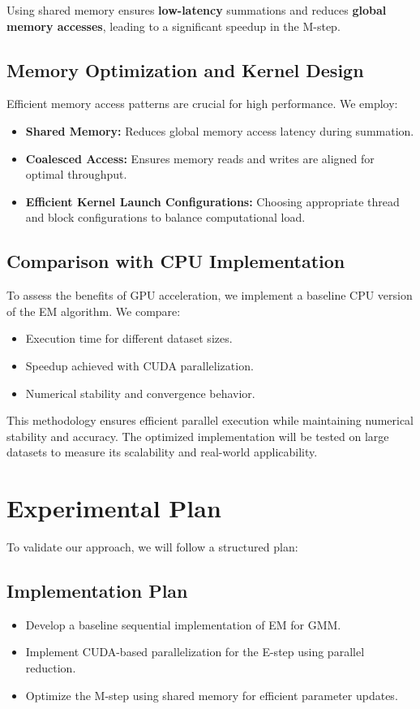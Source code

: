 \documentclass{article}
\begin{document}
Using shared memory ensures \textbf{low-latency} summations and reduces \textbf{global memory accesses}, leading to a significant speedup in the M-step.


\subsection{Memory Optimization and Kernel Design}
Efficient memory access patterns are crucial for high performance. We employ:
\begin{itemize}
    \item \textbf{Shared Memory:} Reduces global memory access latency during summation.
    \item \textbf{Coalesced Access:} Ensures memory reads and writes are aligned for optimal throughput.
    \item \textbf{Efficient Kernel Launch Configurations:} Choosing appropriate thread and block configurations to balance computational load.
\end{itemize}

\subsection{Comparison with CPU Implementation}
To assess the benefits of GPU acceleration, we implement a baseline CPU version of the EM algorithm. We compare:
\begin{itemize}
    \item Execution time for different dataset sizes.
    \item Speedup achieved with CUDA parallelization.
    \item Numerical stability and convergence behavior.
\end{itemize}

This methodology ensures efficient parallel execution while maintaining numerical stability and accuracy. The optimized implementation will be tested on large datasets to measure its scalability and real-world applicability.

\section{Experimental Plan}
To validate our approach, we will follow a structured plan:

\subsection{Implementation Plan}
\begin{itemize}
    \item Develop a baseline sequential implementation of EM for GMM.
    \item Implement CUDA-based parallelization for the E-step using parallel reduction.
    \item Optimize the M-step using shared memory for efficient parameter updates.
\end{itemize}
\end{document}
